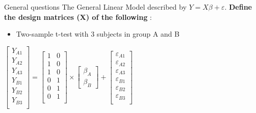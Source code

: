 \documentclass{beamer}
\begin{document}
\begin{frame}{General questions}  
The General Linear Model described by $Y=X\beta+\varepsilon$. \textbf{Define the design matrices (X) of the following} :
  
      \begin{itemize}
	\item Two-sample t-test with 3 subjects in group A and B
      \end{itemize}
	
      \begin{center}
	$
	\left[\begin{array}{c}
	Y_{A1} \\
	Y_{A2} \\
	Y_{A3} \\
	Y_{B1} \\
	Y_{B2} \\
	Y_{B3} \\
	\end{array}\right]
      =
      \left[\begin{array}{cc}1 & 0 \\ 
			      1 & 0 \\
			      1 & 0 \\
			      0 & 1 \\
			      0 & 1 \\
			      0 & 1 \\ 
      \end{array}\right] 
      \times
      \left[\begin{array}{c} 
      \beta_{A} \\
      \beta_{B} 
      \end{array}\right] 
      + 
      \left[\begin{array}{c} 
      \varepsilon_{A1} \\
      \varepsilon_{A2} \\
      \varepsilon_{A3} \\
      \varepsilon_{B1} \\
      \varepsilon_{B2} \\
      \varepsilon_{B3} \\
      \end{array}\right] 
	$
      \end{center}
\end{frame}
\end{document}
